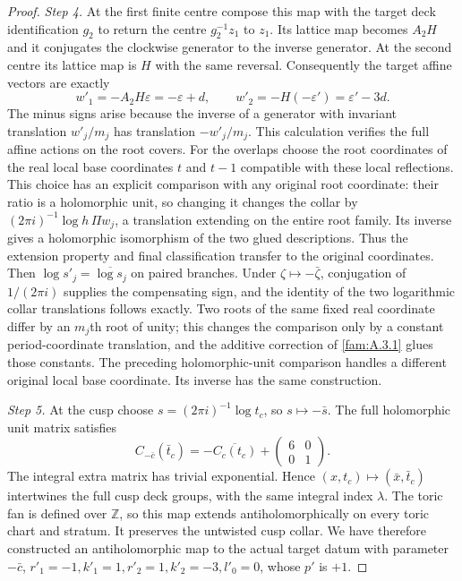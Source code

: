 \documentclass[11pt,a4paper]{article}
\theoremstyle{plain}
\theoremstyle{definition}
\begin{document}
\begin{proof}
\par\noindent\textit{Step 4.} At the first finite centre compose this map with the target deck identification $g_2$ to return the centre $g_2^{-1}z_1$ to $z_1$. Its lattice map becomes $A_2H$ and it conjugates the clockwise generator to the inverse generator. At the second centre its lattice map is $H$ with the same reversal. Consequently the target affine vectors are exactly
\[
 w'_1=-A_2H\varepsilon=-\varepsilon+d,\qquad
 w'_2=-H(-\varepsilon')=\varepsilon'-3d.
\]
The minus signs arise because the inverse of a generator with invariant translation $w'_j/m_j$ has translation $-w'_j/m_j$. This calculation verifies the full affine actions on the root covers. For the overlaps choose the root coordinates of the real local base coordinates $t$ and $t-1$ compatible with these local reflections. This choice has an explicit comparison with any original root coordinate: their ratio is a holomorphic unit, so changing it changes the collar by $(2\pi i)^{-1}\log h\,\Pi w_j$, a translation extending on the entire root family. Its inverse gives a holomorphic isomorphism of the two glued descriptions. Thus the extension property and final classification transfer to the original coordinates. Then $\log s'_j=\overline{\log s_j}$ on paired branches. Under $\zeta\mapsto-\bar\zeta$, conjugation of $1/(2\pi i)$ supplies the compensating sign, and the identity of the two logarithmic collar translations follows exactly. Two roots of the same fixed real coordinate differ by an $m_j$th root of unity; this changes the comparison only by a constant period-coordinate translation, and the additive correction of \ref{fam:A.3.1} glues those constants. The preceding holomorphic-unit comparison handles a different original local base coordinate. Its inverse has the same construction.

\par\noindent\textit{Step 5.} At the cusp choose $s=(2\pi i)^{-1}\log t_c$, so $s\mapsto-\bar s$. The full holomorphic unit matrix satisfies
\[
 C_{-\bar c}(\bar t_c)=-\overline{C_c(t_c)}+
       \begin{pmatrix}6&0\\0&1\end{pmatrix}.
\]
The integral extra matrix has trivial exponential. Hence $(x,t_c)\mapsto(\bar x,\bar t_c)$ intertwines the full cusp deck groups, with the same integral index $\lambda$. The toric fan is defined over $\mathbb Z$, so this map extends antiholomorphically on every toric chart and stratum. It preserves the untwisted cusp collar. We have therefore constructed an antiholomorphic map to the actual target datum with parameter $-\bar c$, $r'_1=-1,k'_1=1,r'_2=1,k'_2=-3,l'_0=0$, whose $p'$ is $+1$.


\end{proof}
\end{document}
